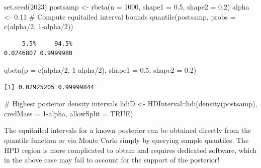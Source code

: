 \documentclass[
  11pt,
  letterpaper,
]{scrbook}
\newenvironment{Shaded}{\begin{snugshade}}{\end{snugshade}}
\newcommand{\AttributeTok}[1]{\textcolor[rgb]{0.40,0.45,0.13}{#1}}
\newcommand{\CommentTok}[1]{\textcolor[rgb]{0.37,0.37,0.37}{#1}}
\newcommand{\ConstantTok}[1]{\textcolor[rgb]{0.56,0.35,0.01}{#1}}
\newcommand{\DecValTok}[1]{\textcolor[rgb]{0.68,0.00,0.00}{#1}}
\newcommand{\FloatTok}[1]{\textcolor[rgb]{0.68,0.00,0.00}{#1}}
\newcommand{\FunctionTok}[1]{\textcolor[rgb]{0.28,0.35,0.67}{#1}}
\newcommand{\NormalTok}[1]{\textcolor[rgb]{0.00,0.23,0.31}{#1}}
\newcommand{\OtherTok}[1]{\textcolor[rgb]{0.00,0.23,0.31}{#1}}
\newcommand{\SpecialCharTok}[1]{\textcolor[rgb]{0.37,0.37,0.37}{#1}}
\theoremstyle{definition}
\theoremstyle{plain}
\theoremstyle{plain}
\theoremstyle{plain}
\theoremstyle{definition}
\theoremstyle{definition}
\theoremstyle{plain}
\theoremstyle{plain}
\theoremstyle{remark}
\begin{document}
\begin{Shaded}
\begin{Highlighting}[]
\FunctionTok{set.seed}\NormalTok{(}\DecValTok{2023}\NormalTok{)}
\NormalTok{postsamp }\OtherTok{\textless{}{-}} \FunctionTok{rbeta}\NormalTok{(}\AttributeTok{n =} \DecValTok{1000}\NormalTok{, }\AttributeTok{shape1 =} \FloatTok{0.5}\NormalTok{, }\AttributeTok{shape2 =} \FloatTok{0.2}\NormalTok{)}
\NormalTok{alpha }\OtherTok{\textless{}{-}} \FloatTok{0.11}
\CommentTok{\# Compute equitailed interval bounds}
\FunctionTok{quantile}\NormalTok{(postsamp, }\AttributeTok{probs =} \FunctionTok{c}\NormalTok{(alpha}\SpecialCharTok{/}\DecValTok{2}\NormalTok{, }\DecValTok{1}\SpecialCharTok{{-}}\NormalTok{alpha}\SpecialCharTok{/}\DecValTok{2}\NormalTok{))}
\end{Highlighting}
\end{Shaded}

\begin{verbatim}
     5.5%     94.5% 
0.0246807 0.9999980 
\end{verbatim}

\begin{Shaded}
\begin{Highlighting}[]
\FunctionTok{qbeta}\NormalTok{(}\AttributeTok{p =} \FunctionTok{c}\NormalTok{(alpha}\SpecialCharTok{/}\DecValTok{2}\NormalTok{, }\DecValTok{1}\SpecialCharTok{{-}}\NormalTok{alpha}\SpecialCharTok{/}\DecValTok{2}\NormalTok{), }\AttributeTok{shape1 =} \FloatTok{0.5}\NormalTok{, }\AttributeTok{shape2 =} \FloatTok{0.2}\NormalTok{)}
\end{Highlighting}
\end{Shaded}

\begin{verbatim}
[1] 0.02925205 0.99999844
\end{verbatim}

\begin{Shaded}
\begin{Highlighting}[]
\CommentTok{\# Highest posterior density intervals}
\NormalTok{hdiD }\OtherTok{\textless{}{-}}\NormalTok{ HDInterval}\SpecialCharTok{::}\FunctionTok{hdi}\NormalTok{(}\FunctionTok{density}\NormalTok{(postsamp), }\AttributeTok{credMass =} \DecValTok{1}\SpecialCharTok{{-}}\NormalTok{alpha, }\AttributeTok{allowSplit =} \ConstantTok{TRUE}\NormalTok{)}
\end{Highlighting}
\end{Shaded}

The equitailed intervals for a known posterior can be obtained directly
from the quantile function or via Monte Carlo simply by querying sample
quantiles. The HPD region is more complicated to obtain and requires
dedicated software, which in the above case may fail to account for the
support of the posterior!
\end{document}
